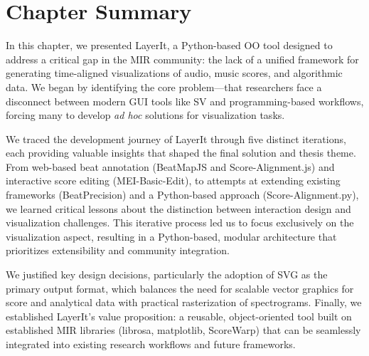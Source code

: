 \section{Chapter Summary}
In this chapter, we presented LayerIt, a Python-based OO tool designed to address a critical gap in the MIR community: the lack of a unified framework for generating time-aligned visualizations of audio, music scores, and algorithmic data. We began by identifying the core problem—that researchers face a disconnect between modern GUI tools like SV and programming-based workflows, forcing many to develop \textit{ad hoc} solutions for visualization tasks. 

We traced the development journey of LayerIt through five distinct iterations, each providing valuable insights that shaped the final solution and thesis theme. From web-based beat annotation (BeatMapJS and Score-Alignment.js) and interactive score editing (MEI-Basic-Edit), to attempts at extending existing frameworks (BeatPrecision) and a Python-based approach (Score-Alignment.py), we learned critical lessons about the distinction between interaction design and visualization challenges. This iterative process led us to focus exclusively on the visualization aspect, resulting in a Python-based, modular architecture that prioritizes extensibility and community integration.

We justified key design decisions, particularly the adoption of SVG as the primary output format, which balances the need for scalable vector graphics for score and analytical data with practical rasterization of spectrograms. Finally, we established LayerIt's value proposition: a reusable, object-oriented tool built on established MIR libraries (librosa, matplotlib, ScoreWarp) that can be seamlessly integrated into existing research workflows and future frameworks.